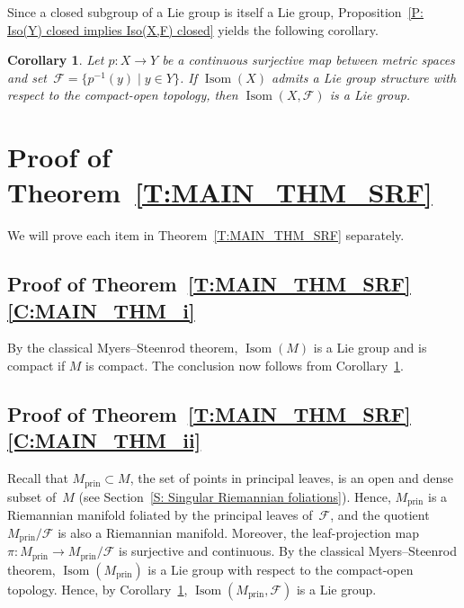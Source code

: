 \documentclass[pdftex]{sigma}
\numberwithin{equation}{section}
\newtheorem{cor}[thm]{Corollary}
\theoremstyle{definition}
\DeclareMathOperator{\Iso}{Isom}
\newcommand{\prin}{\mathrm{prin}}
\newcommand{\fol}{\mathcal{F}}
\begin{document}
Since a closed subgroup of a Lie group is itself a Lie group, Proposition~\ref{P: Iso(Y) closed implies Iso(X,F) closed} yields the following corollary.



\begin{cor}\label{C: Lie group Iso(Y) and closed implies Lie group Iso(M,F)}
Let $p\colon X\to Y$ be a continuous surjective map between metric spaces
and set~${\fol = \{p^{-1}(y)\mid y\in Y\}}$. If $\Iso(X)$ admits a Lie group structure with respect to the compact-open topology, then $\Iso (X,\fol)$ is a Lie group.
\end{cor}


\section[Proof of Theorem A]{Proof of Theorem~\ref{T:MAIN_THM_SRF}}\label{S: proof of Main corollary}
We will prove each item in Theorem~\ref{T:MAIN_THM_SRF} separately.



\subsection[Proof of Theorem A (i)]{Proof of Theorem~\ref{T:MAIN_THM_SRF}\,\ref{C:MAIN_THM_i}}
By the classical Myers--Steenrod theorem, $\Iso(M)$
is a Lie group and is compact if $M$ is compact. The conclusion now follows from Corollary~\ref{C: Lie group Iso(Y) and closed implies Lie group Iso(M,F)}.




\subsection[Proof of Theorem A (ii)]{Proof of Theorem~\ref{T:MAIN_THM_SRF}\,\ref{C:MAIN_THM_ii}}

Recall that $M_\prin\subset M$, the set of points in principal leaves, is an open and dense subset of~$M$ (see Section~\ref{S: Singular Riemannian foliations}).
Hence, $M_\prin$ is a Riemannian manifold foliated by the principal leaves of~$\fol$, and the quotient $M_\prin/\fol$ is also a Riemannian manifold.
Moreover, the leaf-projection map~${\pi\colon M_\prin\to M_\prin/\fol}$ is surjective and continuous.
By the classical Myers--Steenrod theorem, $\Iso(M_\prin)$ is a Lie group with respect to the compact-open topology. Hence, by Corollary~\ref{C: Lie group Iso(Y) and closed implies Lie group Iso(M,F)}, $\Iso(M_\prin,\fol)$ is a Lie group.
\end{document}
